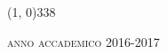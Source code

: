 \begin{titlepage}
\begin{center}
\begin{large}
\begin{flushright}
\vspace{5pt}
\myName
\end{flushright}
\end{large}

\vspace{40pt}

\line(1, 0){338}											%
\begin{normalsize}

\textsc{anno accademico 2016-2017}
\end{normalsize}

\end{center}
\end{titlepage}